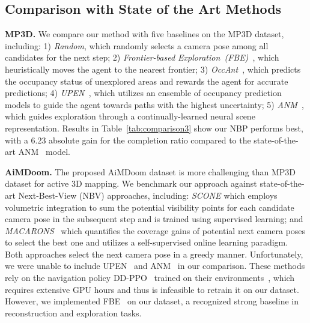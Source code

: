 

\subsection{Comparison with State of the Art Methods}

\noindent \textbf{MP3D.}
%
We compare our method with five baselines on the MP3D dataset, including: 
1) \emph{Random}, which randomly selects a camera pose among all candidates for the next step;
2) \emph{Frontier-based Exploration~(FBE)~\citep{fbe}}, which heuristically moves the agent to the nearest frontier; 
3) \emph{OccAnt~\citep{occant}}, which predicts the occupancy status of unexplored areas and rewards the agent for accurate predictions; 
4) \emph{UPEN~\citep{upen}}, which utilizes an ensemble of occupancy prediction models to guide the agent towards paths with the highest uncertainty; 
5) \emph{ANM~\citep{yan2023active}}, which guides exploration through a continually-learned neural scene representation. 
%
Results in Table~\ref{tab:comparison3} show our NBP performs best, with a 6.23 absolute gain for the completion ratio compared to the state-of-the-art ANM~\citep{yan2023active} model.

% 


\noindent \textbf{AiMDoom.}
%
The proposed AiMDoom dataset is more challenging than MP3D dataset for active 3D mapping.
We benchmark our approach against state-of-the-art Next-Best-View (NBV) approaches, including: 
\textit{{SCONE \citep{guedon2022scone}}} which employs volumetric integration to sum the potential visibility points for each candidate camera pose in the subsequent step and is trained using supervised learning; and
\textit{MACARONS~\citep{guedon2023macarons}} which quantifies the coverage gains of potential next camera poses to select the best one and utilizes a self-supervised online learning paradigm.
Both approaches select the next camera pose in a greedy manner.
Unfortunately, we were unable to include UPEN~\citep{upen} and ANM~\citep{yan2023active} in our comparison.
These methods rely on the navigation policy DD-PPO~\citep{ddppo} trained on their environments~\citep{habitat19iccv}, which requires extensive GPU hours and thus is infeasible to retrain it on our dataset.
However, we implemented FBE~\citep{fbe} on our dataset, a recognized strong baseline in reconstruction and exploration tasks. 


